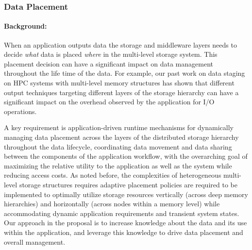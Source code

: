 \subsubsection{Data Placement}
\label{sec:init-plac-data}

\paragraph{Background:}
When an application outputs data the storage and middleware layers needs to
decide \textit{what} data is placed \textit{where} in the multi-level storage system. 
This placement decision can have a significant impact on data management 
throughout the life time of the data. For example, our past work on data 
staging~\cite{tongipdps15,qiansc15,docan2012dataspaces,abbasi2010datastager} 
on HPC systems with multi-level memory structures has shown that different 
output techniques targeting different layers of the storage hierarchy can have a 
significant impact on the overhead observed by the application for I/O operations. 


A key requirement is application-driven runtime mechanisms for dynamically managing 
data placement across the layers of the distributed storage hierarchy throughout the 
data lifecycle, coordinating data movement and data sharing between the components 
of the application workflow, with the overarching goal of maximizing the relative utility 
to the application as well as the system while reducing access costs. 
%
As noted before, the complexities of heterogeneous multi-level storage structures requires 
adaptive placement policies are required to be implemented to optimally utilize storage 
resources vertically (across deep memory hierarchies) and horizontally (across nodes 
within a memory level) while accommodating dynamic application requirements and transient 
system states. 
%
Our approach in the proposal is to increase knowledge about the data and its use within the 
application, and leverage this knowledge to drive data placement and overall management. 


